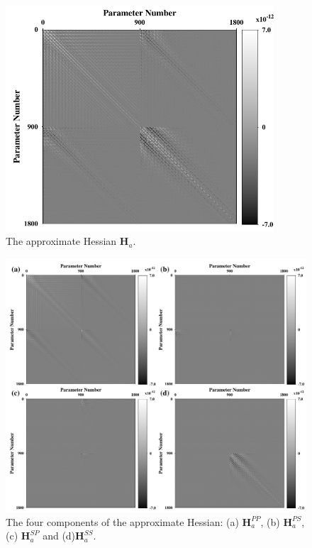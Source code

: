 \begin{figure}
    \begin{center}
        \includegraphics[width=10cm]{Figure/chapter02/ResoOpera/Fig/hessian.pdf}
        \caption{
            The approximate Hessian $\mathbf{H}_a$.
    }
    \label{fig:Hessian} 
    \end{center}
\end{figure}
\begin{figure}
    \begin{center}
        \includegraphics[width=12cm]{Figure/chapter02/ResoOpera/Fig/fourhessian.pdf}
        \caption{
            The four components of the approximate Hessian:
                        (a) $\mathbf{H}_a^{PP}$,
            (b) $\mathbf{H}_a^{PS}$, (c) $\mathbf{H}_a^{SP}$ and (d)$\mathbf{H}_a^{SS}$.
    }
    \label{fig:fourHessian}
    \end{center}
\end{figure}



